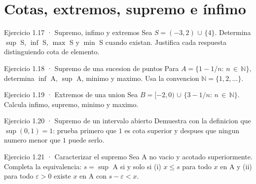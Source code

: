 \documentclass[10pt,a4paper,oneside,openany]{book}
\begin{document}
\section{Cotas, extremos, supremo e ínfimo}
\begin{PSevenExerciseFixed}{Ejercicio 1.17 · Supremo, infimo y extremos}
Sea \(S=(-3,2)\) \(\cup \) \(\{4\}\). Determina \(\sup\) S, \(\inf\) S, \(\max\) S y \(\min\) S cuando existan. Justifica cada respuesta distinguiendo cota de elemento.
\end{PSevenExerciseFixed}
\begin{PSevenExerciseFixed}{Ejercicio 1.18 · Supremo de una sucesion de puntos}
Para \(A=\{1-1/n:\,n\,\in \,\mathbb{N}\},\) determina \(\inf\) A, \(\sup\) A, minimo y maximo. Usa la convencion \(\mathbb{N}=\{1,2,\ldots \}\).
\end{PSevenExerciseFixed}
\begin{PSevenExerciseFixed}{Ejercicio 1.19 · Extremos de una union}
Sea \(B=[-2,0)\) \(\cup \) \(\{3-1/n:\,n\,\in \,\mathbb{N}\}\). Calcula infimo, supremo, minimo y maximo.
\end{PSevenExerciseFixed}
\begin{PSevenExerciseFixed}{Ejercicio 1.20 · Supremo de un intervalo abierto}
Demuestra con la definicion que \(\sup(0,1)=1\): prueba primero que \(1\) es cota superior y despues que ningun numero menor que \(1\) puede serlo.
\end{PSevenExerciseFixed}
\begin{PSevenExerciseFixed}{Ejercicio 1.21 · Caracterizar el supremo}
Sea A no vacio y acotado superiormente. Completa la equivalencia: \(s=\sup\) A si y solo si (i) \(x\le s\) para todo \(x\) en A y (ii) para todo \(\varepsilon >0\) existe \(x\) en A con \(s-\varepsilon <x\).
\end{PSevenExerciseFixed}
\end{document}
